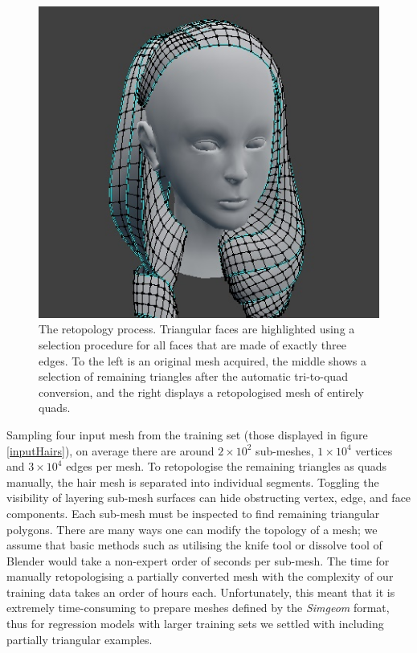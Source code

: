 \documentclass[ %
author={Dillon Keith Diep},
supervisor={Dr. Carl Henrik Ek},
degree={MEng},
title={ART-CG Hair:},
subtitle={Assisted Real-time Content Generation of Stylised Virtual Hair},
type={Research},
year={2017} ]{dissertation}
\begin{document}
\begin{figure}[!h]
		\includegraphics[scale=2]{images/triToQuad3}
		\caption{The retopology process. Triangular faces are highlighted using a selection procedure for all faces that are made of exactly three edges. To the left is an original mesh acquired, the middle shows a selection of remaining triangles after the automatic tri-to-quad conversion, and the right displays a retopologised mesh of entirely quads.}
		\label{fig:triToQuad}
	\end{figure}
	
	Sampling four input mesh from the training set (those displayed in figure \ref{inputHairs}), on average there are around $2 \times 10^{2}$ sub-meshes, $1 \times 10^{4}$ vertices and  $3 \times 10^{4}$ edges per mesh. To retopologise the remaining triangles as quads manually, the hair mesh is separated into individual segments. Toggling the visibility of layering sub-mesh surfaces can hide obstructing vertex, edge, and face components. Each sub-mesh must be inspected to find remaining triangular polygons. There are many ways one can modify the topology of a mesh; we assume that basic methods such as utilising the knife tool or dissolve tool of Blender would take a non-expert order of seconds per sub-mesh. The time for manually retopologising a partially converted mesh with the complexity of our training data takes an order of hours each. Unfortunately, this meant that it is extremely time-consuming to prepare meshes defined by the \textit{Simgeom} format, thus for regression models with larger training sets we settled with including partially triangular examples.
	
\end{document}
